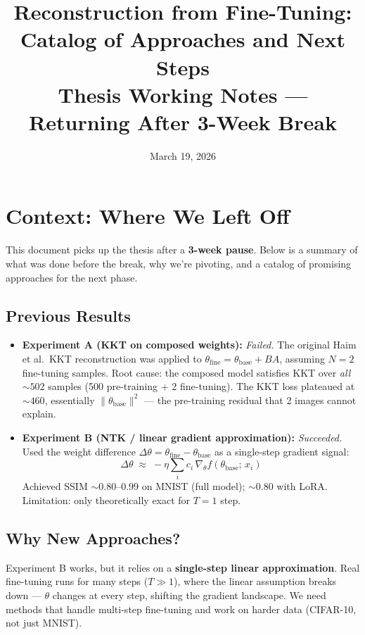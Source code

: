 \documentclass[11pt,a4paper]{article}
\title{%
  \textbf{Reconstruction from Fine-Tuning:\\Catalog of Approaches and Next Steps}\\[0.5em]
  \large Thesis Working Notes — Returning After 3-Week Break
}
\author{}
\date{March 19, 2026}
\begin{document}
\maketitle

\section{Context: Where We Left Off}

This document picks up the thesis after a \textbf{3-week pause}. Below is a summary of what was done before the break, why we're pivoting, and a catalog of promising approaches for the next phase.

\subsection{Previous Results}

\begin{itemize}
  \item \textbf{Experiment A (KKT on composed weights):} \emph{Failed.}
    The original Haim et al.\ KKT reconstruction was applied to $\theta_{\mathrm{fine}} = \theta_{\mathrm{base}} + BA$, assuming $N=2$ fine-tuning samples.
    Root cause: the composed model satisfies KKT over \emph{all} ${\sim}502$ samples (500 pre-training + 2 fine-tuning).
    The KKT loss plateaued at ${\sim}460$, essentially $\|\theta_{\mathrm{base}}\|^2$ — the pre-training residual that 2 images cannot explain.

  \item \textbf{Experiment B (NTK / linear gradient approximation):} \emph{Succeeded.}
    Used the weight difference $\Delta\theta = \theta_{\mathrm{fine}} - \theta_{\mathrm{base}}$ as a single-step gradient signal:
    \[
      \Delta\theta \;\approx\; -\eta \sum_i c_i \,\nabla_\theta f(\theta_{\mathrm{base}};\, x_i)
    \]
    Achieved SSIM $\sim$0.80--0.99 on MNIST (full model); $\sim$0.80 with LoRA.
    Limitation: only theoretically exact for $T=1$ step.
\end{itemize}

\subsection{Why New Approaches?}

Experiment B works, but it relies on a \textbf{single-step linear approximation}. Real fine-tuning runs for many steps ($T \gg 1$), where the linear assumption breaks down — $\theta$ changes at every step, shifting the gradient landscape. We need methods that handle multi-step fine-tuning and work on harder data (CIFAR-10, not just MNIST).
\end{document}
